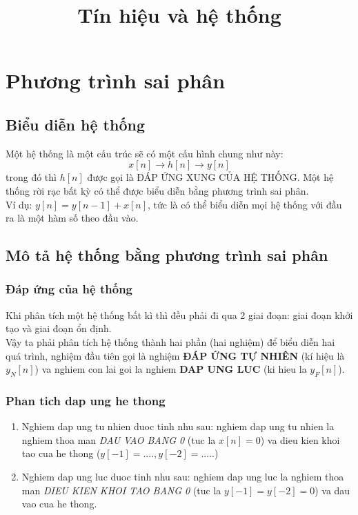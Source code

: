\documentclass{article}
\title{Tín hiệu và hệ thống}
\begin{document}
\maketitle
\section{Phương trình sai phân}
\subsection{Biểu diễn hệ thống}
Một hệ thống là một cấu trúc sẽ có một cấu hình chung như này:
\begin{equation*}
    x[n]\rightarrow h[n] \rightarrow y[n]
\end{equation*}
trong đó thì $h[n]$ được gọi là ĐÁP ỨNG XUNG CỦA HỆ THỐNG.
Một hệ thống rời rạc bất kỳ có thể được biểu diễn bằng phương trình sai phân.
\\ Ví dụ: $y[n] = y[n-1] + x[n]$, tức là có thể biểu diễn mọi hệ thống với đầu ra là một hàm số theo đầu vào.
\subsection{Mô tả hệ thống bằng phương trình sai phân}
\subsubsection{Đáp ứng của hệ thống}
Khi phân tích một hệ thống bất kì thì đều phải đi qua 2 giai đoạn: giai đoạn khởi tạo và giai đoạn ổn định.
\\ Vậy ta phải phân tích hệ thống thành hai phần (hai nghiệm) để biểu diễn hai quá trình, nghiệm đầu tiên gọi là nghiệm \textbf{ĐÁP ỨNG TỰ NHIÊN} (kí hiệu là $y_{N}[n]$) va nghiem con lai goi la nghiem
\textbf{DAP UNG LUC} (ki hieu la $y_{F}[n]$). 
\subsubsection{Phan tich dap ung he thong}
\begin{enumerate}
    \item Nghiem dap ung tu nhien duoc tinh nhu sau: nghiem dap ung tu nhien la nghiem thoa man \textit{DAU VAO BANG 0} (tuc la $x[n]=0$) va dieu kien khoi tao cua he thong ($y[-1] = ...., y[-2] = .....$)
    \item Nghiem dap ung luc duoc tinh nhu sau: nghiem dap ung luc la nghiem thoa man \textit{DIEU KIEN KHOI TAO BANG 0} (tuc la $y[-1]=y[-2]=0$) va dau vao cua he thong.
\end{enumerate}
\end{document}
